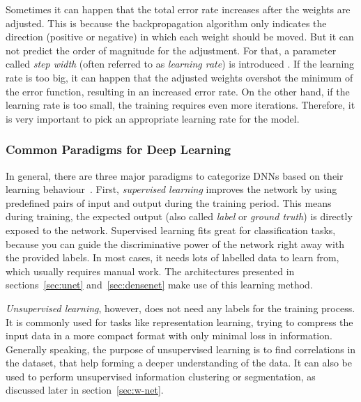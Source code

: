 Sometimes it can happen that the total error rate increases after the weights are adjusted. This is because the backpropagation algorithm only indicates the direction (positive or negative) in which each weight should be moved. But it can not predict the order of magnitude for the adjustment. For that, a parameter called \emph{step width} (often referred to as \emph{learning rate}) is introduced \cite[p.~169]{nn_intro96}. If the learning rate is too big, it can happen that the adjusted weights overshot the minimum of the error function, resulting in an increased error rate. On the other hand, if the learning rate is too small, the training requires even more iterations. Therefore, it is very important to pick an appropriate learning rate for the model.


\subsubsection{Common Paradigms for Deep Learning}
\label{sec:dl_paradigms}
In general, there are three major paradigms to categorize DNNs based on their learning behaviour~\cite[p.~214f]{dlma14}. First, \emph{supervised learning} improves the network by using predefined pairs of input and output during the training period. This means during training, the expected output (also called \emph{label} or \emph{ground truth}) is directly exposed to the network. Supervised learning fits great for classification tasks, because you can guide the discriminative power of the network right away with the provided labels. In most cases, it needs lots of labelled data to learn from, which usually requires manual work. The architectures presented in sections~\ref{sec:unet} and~\ref{sec:densenet} make use of this learning method.

\emph{Unsupervised learning}, however, does not need any labels for the training process. It is commonly used for tasks like representation learning, trying to compress the input data in a more compact format with only minimal loss in information. Generally speaking, the purpose of unsupervised learning is to find correlations in the dataset, that help forming a deeper understanding of the data. It can also be used to perform unsupervised information clustering or segmentation, as discussed later in section~\ref{sec:w-net}.

